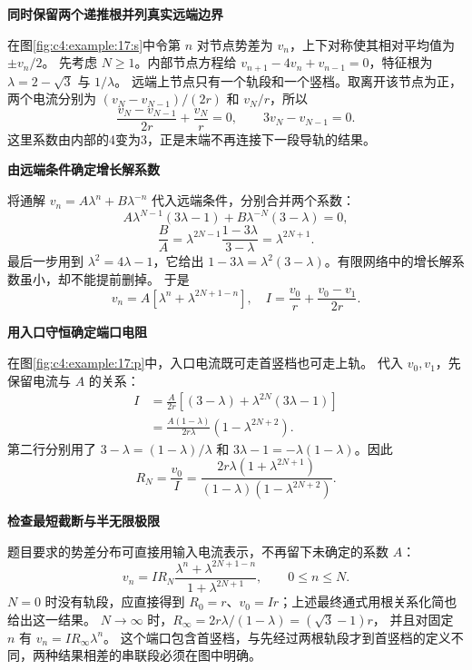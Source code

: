 \begin{solution}\textbf{同时保留两个递推根并列真实远端边界}\par\nobreak
在图\ref{fig:c4:example:17:s}中令第 $n$ 对节点势差为 $v_n$，上下对称使其相对平均值为 $\pm v_n/2$。
先考虑 $N\ge1$。内部节点方程给 $v_{n+1}-4v_n+v_{n-1}=0$，特征根为 $\lambda=2-\sqrt3$ 与 $1/\lambda$。
远端上节点只有一个轨段和一个竖档。取离开该节点为正，两个电流分别为
$(v_N-v_{N-1})/(2r)$ 和 $v_N/r$，所以
\[
 \frac{v_N-v_{N-1}}{2r}+\frac{v_N}{r}=0,
 \qquad 3v_N-v_{N-1}=0.
\]
这里系数由内部的4变为3，正是末端不再连接下一段导轨的结果。



\par\medskip{}\noindent\textbf{由远端条件确定增长解系数}\par\nobreak
将通解 $v_n=A\lambda^n+B\lambda^{-n}$ 代入远端条件，分别合并两个系数：
\[
 A\lambda^{N-1}(3\lambda-1)+B\lambda^{-N}(3-\lambda)=0,
\]
\[
 \frac BA=\lambda^{2N-1}\frac{1-3\lambda}{3-\lambda}
 =\lambda^{2N+1}.
\]
最后一步用到 $\lambda^2=4\lambda-1$，它给出
$1-3\lambda=\lambda^2(3-\lambda)$。有限网络中的增长解系数虽小，却不能提前删掉。
于是
\[
 v_n=A[\lambda^n+\lambda^{2N+1-n}],\quad
 I=\frac{v_0}{r}+\frac{v_0-v_1}{2r}.
\]


\par\medskip{}\noindent\textbf{用入口守恒确定端口电阻}\par\nobreak
在图\ref{fig:c4:example:17:p}中，入口电流既可走首竖档也可走上轨。
代入 $v_0,v_1$，先保留电流与 $A$ 的关系：
\begin{align*}
 I&=\frac A{2r}\left[(3-\lambda)+\lambda^{2N}(3\lambda-1)\right]\\
 &=\frac{A(1-\lambda)}{2r\lambda}(1-\lambda^{2N+2}).
\end{align*}
第二行分别用了 $3-\lambda=(1-\lambda)/\lambda$ 和
$3\lambda-1=-\lambda(1-\lambda)$。因此
\[
 R_N=\frac{v_0}{I}
 =\frac{2r\lambda(1+\lambda^{2N+1})}
 {(1-\lambda)(1-\lambda^{2N+2})}.
\]


\par\medskip{}\noindent\textbf{检查最短截断与半无限极限}\par\nobreak
题目要求的势差分布可直接用输入电流表示，不再留下未确定的系数 $A$：
\[
 \boxed{v_n=IR_N\frac{\lambda^n+\lambda^{2N+1-n}}
 {1+\lambda^{2N+1}}},\qquad 0\le n\le N.
\]
$N=0$ 时没有轨段，应直接得到 $R_0=r$、$v_0=Ir$；上述最终通式用根关系化简也给出这一结果。
$N\to\infty$ 时，$R_\infty=2r\lambda/(1-\lambda)=(\sqrt3-1)r$，
并且对固定 $n$ 有 $v_n=IR_\infty\lambda^n$。
这个端口包含首竖档，与先经过两根轨段才到首竖档的定义不同，两种结果相差的串联段必须在图中明确。\end{solution}
